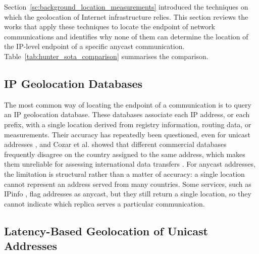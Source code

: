 Section~\ref{sc:background_location_measurements} introduced the techniques on which the geolocation of Internet infrastructure relies. This section reviews the works that apply these techniques to locate the endpoint of network communications and identifies why none of them can determine the location of the IP-level endpoint of a specific anycast communication. Table~\ref{tab:hunter_sota_comparison} summarises the comparison.

\subsection{IP Geolocation Databases}
\label{sc:hunter_sota_databases}

The most common way of locating the endpoint of a communication is to query an IP geolocation database. These databases associate each IP address, or each prefix, with a single location derived from registry information, routing data, or measurements. Their accuracy has repeatedly been questioned, even for unicast addresses \cite{Poese2011IPUnreliable, Ding2015AnSub-networks}, and Cozar et al. showed that different commercial databases frequently disagree on the country assigned to the same address, which makes them unreliable for assessing international data transfers \cite{Cozar2022ReliabilityTransfers}. For anycast addresses, the limitation is structural rather than a matter of accuracy: a single location cannot represent an address served from many countries. Some services, such as IPinfo \cite{IPIPinfo}, flag addresses as anycast, but they still return a single location, so they cannot indicate which replica serves a particular communication.

\subsection{Latency-Based Geolocation of Unicast Addresses}
\label{sc:hunter_sota_unicast}

